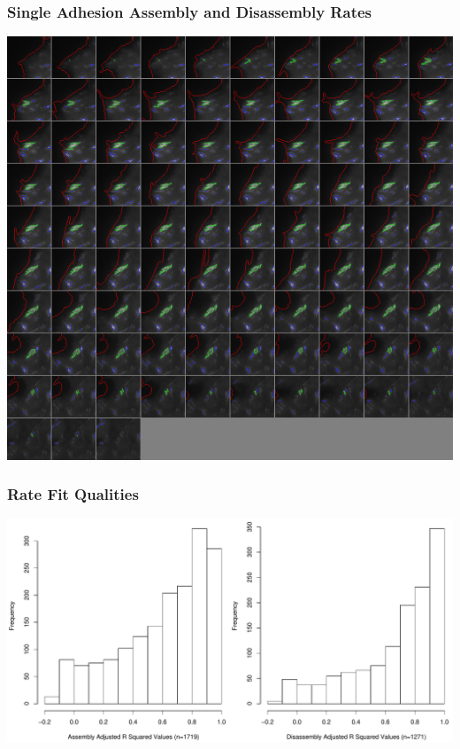 \documentclass{beamer}
\begin{document}
\begin{frame}
	\frametitle{Single Adhesion Assembly and Disassembly Rates}
	 {
	\begin{center}
	\includegraphics[height=0.75\textheight]{figures/analysis/montage_01154}
	\end{center}
	}
\end{frame}

\begin{frame}
	\frametitle{Rate Fit Qualities}
	\includegraphics[width=\textwidth]{figures/analysis/R_sq_hist_all}
\end{frame}
\end{document}
